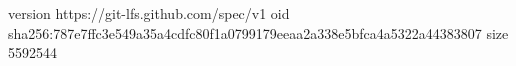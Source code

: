version https://git-lfs.github.com/spec/v1
oid sha256:787e7ffc3e549a35a4cdfc80f1a0799179eeaa2a338e5bfca4a5322a44383807
size 5592544
